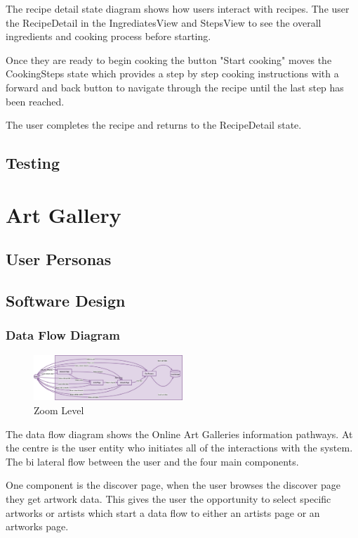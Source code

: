 \documentclass[]{project_final}
\begin{document}
The recipe detail state diagram shows how users interact with recipes.
The user the RecipeDetail in the IngrediatesView and StepsView to see the overall ingredients and cooking process before starting.

Once they are ready to begin cooking the button "Start cooking" moves the CookingSteps state which provides a step by step cooking instructions with a forward and back button to navigate through the recipe until the last step has been reached.

The user completes the recipe and returns to the RecipeDetail state.
\newpage




\subsection{Testing}

\newpage
\section{Art Gallery}
\subsection{User Personas}
\subsection{Software Design}
\subsubsection{Data Flow Diagram}
\begin{figure}[ht!]
  \centering
  \includegraphics[width=0.5\textwidth]{DataFlowDiagram.png}
  \vspace*{0.0cm}
  \caption{Zoom Level}
  \label{fig:1}
\end{figure}

The data flow diagram shows the Online Art Galleries information pathways.
At the centre is the user entity who initiates all of the interactions with the system. The bi lateral flow between the user and the four main components.

One component is the discover page, when the user browses the discover page they get artwork data. This gives the user the opportunity to select specific artworks or artists which start a data flow to either an artists page or an artworks page.
\end{document}
